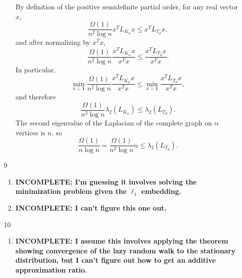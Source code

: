 \documentclass{article}
\newcommand{\incomplete}[1]{\textbf{INCOMPLETE: #1}}
\newcommand{\1}{\mathbf{1}}
\newcommand{\0}{\mathbf{0}}
\begin{document}
\begin{enumerate}
\begin{enumerate}
    By definition of the positive semidefinite partial order, for any real vector $x$,
    \begin{equation*}
      \frac{\Omega(1)}{n^2 \log n} x^T L_{K_n} x \leq x^T L_{T_d} x,
    \end{equation*}
    and after normalizing by $x^T x$,
    \begin{equation*}
      \frac{\Omega(1)}{n^2 \log n} \frac{x^T L_{K_n} x}{x^T x} \leq \frac{x^T L_{T_d} x}{x^T x}.
    \end{equation*}
    In particular,
    \begin{equation*}
      \min_{x \perp \1} \frac{\Omega(1)}{n^2 \log n} \frac{x^T L_{K_n} x}{x^T x} \leq \min_{x \perp \1} \frac{x^T L_{T_d} x}{x^T x},
    \end{equation*}
    and therefore
    \begin{equation*}
      \frac{\Omega(1)}{n^2 \log n} \lambda_2(L_{K_n}) \leq \lambda_2(L_{T_d}).
    \end{equation*}
    The second eigenvalue of the Laplacian of the complete graph on $n$ vertices is $n$, so
    \begin{equation*}
      \frac{\Omega(1)}{n \log n} = \frac{\Omega(1)}{n^2 \log n} n \leq \lambda_2(L_{T_d}).
    \end{equation*}
  \end{enumerate}
\item[9]
  \begin{enumerate}
  \item \incomplete{I'm guessing it involves solving the minimization problem given the $\ell_1$ embedding.}
  \item \incomplete{I can't figure this one out.}
  \end{enumerate}
\item[10]
  \begin{enumerate}
  \item \incomplete{I assume this involves applying the theorem showing convergence of the lazy random walk to the stationary distribution, but I can't figure out how to get an additive approximation ratio.}
  \end{enumerate}
\end{enumerate}

\end{document}
